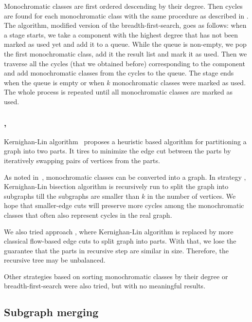 Monochromatic classes are first ordered descending by their degree.
Then cycles are found for each monochromatic class with the same procedure
as described in .
The algorithm, modified version of the breadth-first-search, goes as follows:
when a stage starts, we take a component with the highest degree
that has not been marked as used yet and add it to a queue.
While the queue is non-empty, we pop the first monochromatic class,
add it the result list and mark it as used.
Then we traverse all the cycles (that we obtained before)
corresponding to the component
and add monochromatic classes from the cycles to the queue.
The stage ends when the queue is empty or when \( k \) monochromatic classes
were marked as used. The whole process is repeated until
all monochromatic classes are marked as used.

\subsubsection*{\KernighanLin{}, \Cuts{}}

Kernighan-Lin algorithm~\cite{kernighan_lin} proposes a heuristic based algorithm
for partitioning a graph into two parts. It tires to minimize the edge cut between
the parts by iteratively swapping pairs of vertices from the parts.

As noted in~,
monochromatic classes can be converted into a graph.
In strategy \KernighanLin{},
Kernighan-Lin bisection algorithm is recursively run to split the graph
into subgraphs till the subgraphs are smaller than \( k \) in the number of vertices.
We hope that smaller-edge cuts will preserve more cycles among
the monochromatic classes that often also represent cycles in the real graph.

We also tried approach \Cuts{}, where Kernighan-Lin algorithm is replaced by
more classical flow-based edge cuts to split graph into parts.
With that, we lose the guarantee that the parts in recursive step
are similar in size. Therefore, the recursive tree may be unbalanced.

Other strategies based on
sorting monochromatic classes by their degree
or breadth-first-search were also tried,
but with no meaningful results.



\subsection{Subgraph merging}%
\label{sec:merging}


